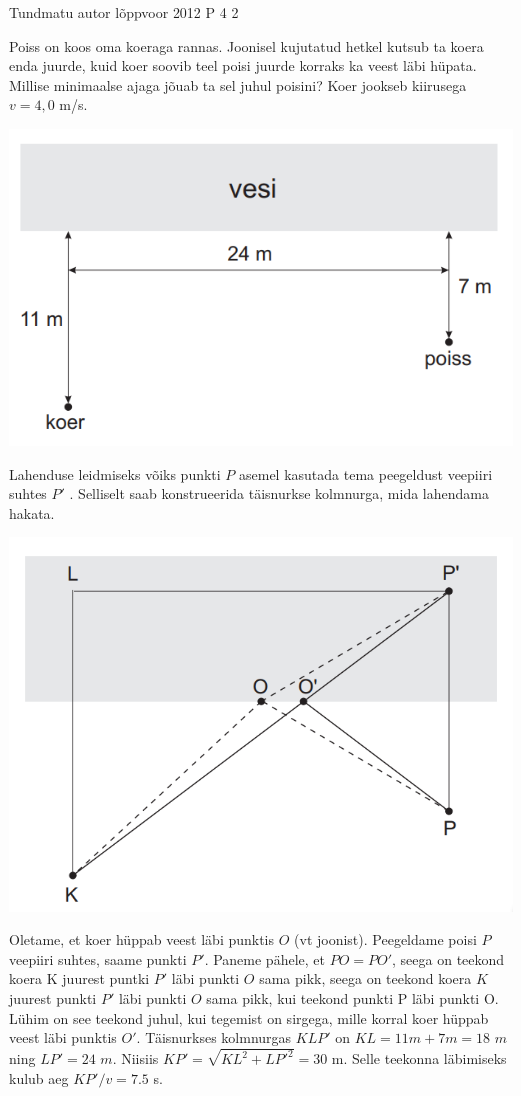 {Tundmatu autor} %
{lõppvoor} %
{2012} %
{P 4} %
{2} %
{

\ifStatement
Poiss on koos oma koeraga rannas. Joonisel kujutatud hetkel kutsub ta koera enda juurde, kuid koer soovib teel poisi juurde korraks ka veest läbi hüpata. Millise minimaalse ajaga jõuab ta sel juhul poisini? Koer jookseb kiirusega $v = 4,0$ m/s.
\begin{center}
	\includegraphics[width=0.5\linewidth]{2012-v3p-04-yl.PNG}
\end{center}
\fi

\ifHint
Lahenduse leidmiseks võiks punkti $P$ asemel kasutada tema peegeldust veepiiri suhtes $P'$ . Selliselt saab konstrueerida täisnurkse kolmnurga, mida lahendama hakata.
\fi

\ifSolution
\begin{center}
	\includegraphics[width=0.5\linewidth]{2012-v3p-04-lah.PNG}
\end{center}
Oletame, et koer hüppab veest läbi punktis $O$ (vt joonist). Peegeldame poisi $P$ veepiiri suhtes, saame punkti $P'$. Paneme pähele, et $PO = PO'$, seega on teekond koera K juurest puntki $P'$ läbi punkti $O$ sama pikk, seega on teekond koera $K$ juurest punkti $P'$ läbi punkti $O$ sama pikk, kui teekond punkti P läbi punkti O. Lühim on see teekond juhul, kui tegemist on sirgega, mille korral koer hüppab veest läbi punktis $O'$.
\newline
Täisnurkses kolmnurgas $KLP'$ on $KL = 11 m + 7 m = 18$ $m$ ning $LP' = 24$ $m$. Niisiis $KP' = \sqrt{KL^2 + LP'^2} = 30$ m. Selle teekonna läbimiseks kulub aeg $KP' /v = 7.5$ s.
\fi
}